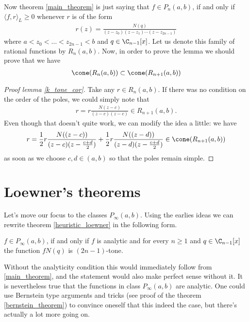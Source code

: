 Now theorem \ref{main_theorem} is just saying that $f \in P_{n}(a, b)$, if and only if $\langle f, r \rangle_{L} \geq 0$ whenever $r$ is of the form
\begin{align*}
	r(z) = \frac{N(q)}{(z - z_{0}) (z - z_{1}) \cdots (z - z_{2 n - 1})}
\end{align*}
where $a < z_{0} < \ldots < z_{2 n - 1} < b$ and $q \in \C_{n - 1}[x]$. Let us denote this family of rational functions by $R_{n}(a, b)$. Now, in order to prove the lemma we should prove that we have
\begin{align*}
	\cone(R_{n}(a, b)) \subset \cone(R_{n + 1}(a, b))
\end{align*}

\begin{proof}[Proof lemma \ref{k_tone_cor}]
	Take any $r \in R_{n}(a, b)$. If there was no condition on the order of the poles, we could simply note that
	\begin{align*}
		r = r \frac{N(z - c)}{(z - c) (z - c)} \in R_{n + 1}(a, b).
	\end{align*}
	Even though that doesn't quite work, we can modify the idea a little: we have
	\begin{align*}
		r = \frac{1}{2} r \frac{N((z - c))}{(z - c) (z - \frac{c + d}{2})} +  \frac{1}{2} r\frac{N((z - d))}{(z - d) (z - \frac{c + d}{2})} \in \cone(R_{n + 1}(a, b))
	\end{align*}
	as soon as we choose $c, d \in (a, b)$ so that the poles remain simple.
\end{proof}

\section{Loewner's theorems}

Let's move our focus to the classes $P_{\infty}(a, b)$. Using the earlies ideas we can rewrite theorem \ref{heuristic_loewner} in the following form.

\begin{lause}\label{better_loewner}
	$f \in P_{\infty}(a, b)$, if and only if $f$ is analytic and for every $n \geq 1$ and $q \in \C_{n - 1}[x]$ the function $f N(q)$ is $(2 n - 1)$-tone.
\end{lause}

Without the analyticity condition this would immediately follow from \ref{main_theorem}, and the statement would also make perfect sense without it. It is nevertheless true that the functions in class $P_{\infty}(a, b)$ are analytic. One could use Bernstein type arguments and tricks (see proof of the theorem \ref{bernstein_theorem}) to convince oneself that this indeed the case, but there's actually a lot more going on.


